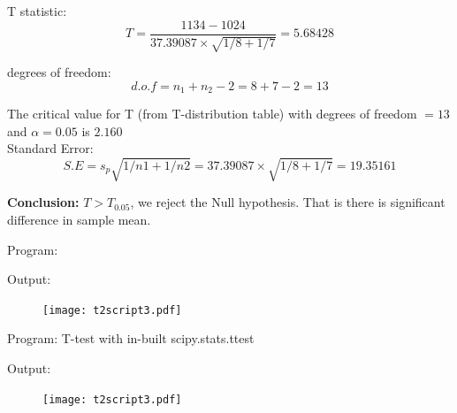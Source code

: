 \documentclass[a4paper,11pt,openright]{report}
\begin{document}
\begin{enumerate}
T statistic:
\begin{equation*}
T = \frac{1134 - 1024}{37.39087 \times \sqrt{1/8 + 1/7}} = 5.68428
\end{equation*}

degrees of freedom:
\begin{equation*}
d.o.f = n_{1} + n_{2} - 2 = 8 + 7 - 2 = 13
\end{equation*}

The critical value for T (from T-distribution table) with degrees of freedom $= 13$ and 
$\alpha = 0.05$ is $2.160$ \\

Standard Error:
\begin{equation*}
S.E = s_{p} \sqrt{1/n1 + 1/n2} = 37.39087 \times \sqrt{1/8 + 1/7} = 19.35161
\end{equation*}

\textbf{Conclusion:} $T > T_{0.05}$, we reject the Null hypothesis. That is there is 
significant difference in sample mean.

Program:

Output:


\begin{figure}[ht!]
\texttt{[image: t2script3.pdf]}
\centering
\end{figure}

Program: T-test with in-built scipy.stats.ttest

Output:


\begin{figure}[ht!]
\texttt{[image: t2script3.pdf]}
\centering
\end{figure}

\end{enumerate}
\end{document}
